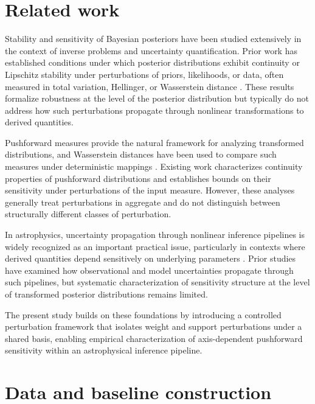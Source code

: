 \documentclass[a4paper,fleqn,usenatbib]{mnras}
\begin{document}
\section{Related work}
\label{sec:relwork}

Stability and sensitivity of Bayesian posteriors have been studied extensively
in the context of inverse problems and uncertainty quantification. Prior work
has established conditions under which posterior distributions exhibit
continuity or Lipschitz stability under perturbations of priors, likelihoods,
or data, often measured in total variation, Hellinger, or Wasserstein distance
\citep{Stuart2010,Sprungk2020}. These results formalize robustness at the level
of the posterior distribution but typically do not address how such
perturbations propagate through nonlinear transformations to derived quantities.

Pushforward measures provide the natural framework for analyzing transformed
distributions, and Wasserstein distances have been used to compare such
measures under deterministic mappings \citep{Villani2009,Santambrogio2015}.
Existing work characterizes continuity properties of pushforward distributions
and establishes bounds on their sensitivity under perturbations of the input
measure. However, these analyses generally treat perturbations in aggregate
and do not distinguish between structurally different classes of perturbation.

In astrophysics, uncertainty propagation through nonlinear inference pipelines
is widely recognized as an important practical issue, particularly in contexts
where derived quantities depend sensitively on underlying parameters
\citep{Do2019}. Prior studies have examined how observational and model
uncertainties propagate through such pipelines, but systematic characterization
of sensitivity structure at the level of transformed posterior distributions
remains limited.

The present study builds on these foundations by introducing a controlled
perturbation framework that isolates weight and support perturbations under a
shared basis, enabling empirical characterization of axis-dependent pushforward
sensitivity within an astrophysical inference pipeline.

\section{Data and baseline construction}
\label{sec:data}
\end{document}
